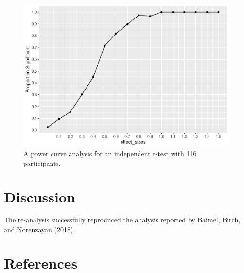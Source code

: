 \documentclass[
  english,
  man,floatsintext]{apa6}
\begin{document}
\begin{figure}
\centering
\includegraphics{Manuscript.final_files/figure-latex/unnamed-chunk-4-1.pdf}
\caption{\label{fig:unnamed-chunk-4}A power curve analysis for an independent t-test with 116 participants.}
\end{figure}

\hypertarget{discussion}{%
\section{Discussion}\label{discussion}}

The re-analysis successfully reproduced the analysis reported by Baimel, Birch, and Norenzayan (2018).

\hypertarget{references}{%
\section{References}\label{references}}

\begingroup
\setlength{\parindent}{-0.5in}
\setlength{\leftskip}{0.5in}
\end{document}
